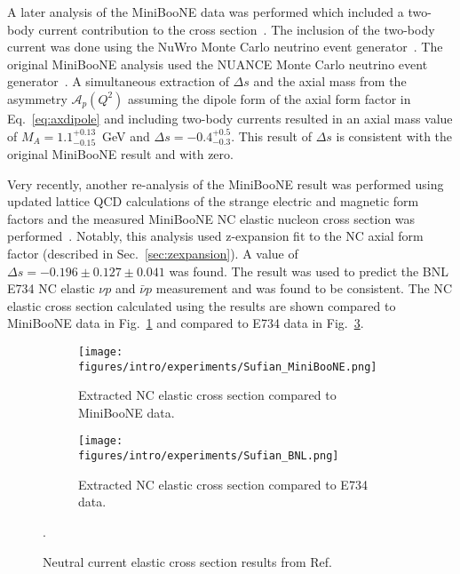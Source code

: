   A later analysis of the MiniBooNE data was performed which included a
  two-body current contribution to the cross section~\cite{Golan:2013jtj}.  The
  inclusion of the two-body current was done using the NuWro Monte Carlo
  neutrino event generator~\cite{Golan:2012wx}. The original MiniBooNE analysis
  used the NUANCE Monte Carlo neutrino event generator~\cite{Casper:2002sd}. A
  simultaneous extraction of $\Delta s$ and the axial mass from the asymmetry
  $\mathcal{A}_p(Q^2)$ assuming the dipole form of the axial form factor in
  Eq.~\ref{eq:axdipole} and including two-body currents resulted in an axial
  mass value of $M_A = 1.1^{+0.13}_{-0.15}$~GeV and $\Delta s =
  -0.4^{+0.5}_{-0.3}$. This result of $\Delta s$ is consistent with the
  original MiniBooNE result and with zero.

  Very recently, another re-analysis of the MiniBooNE result was performed
  using updated lattice QCD calculations of the strange electric and magnetic
  form factors and the measured MiniBooNE NC elastic nucleon cross section
  was performed~\cite{Sufian:2018qtw}. Notably, this analysis used
  z-expansion fit to the NC axial form factor (described in
  Sec.~\ref{sec:zexpansion}). A value of $\Delta s = -0.196\pm 0.127\pm
  0.041$ was found. The result was used to predict the BNL E734 NC elastic
  $\nu p$ and $\bar{\nu} p$ measurement and was found to be consistent. The
  NC elastic cross section calculated using the results are shown compared to
  MiniBooNE data in Fig.~\ref{fig:sufianuboone} and compared to E734 data in
  Fig.~\ref{fig:sufiane734}.
  \begin{figure}[h]
    \centering
    \begin{subfigure}[t]{2.5in}
      \texttt{[image: figures/intro/experiments/Sufian\_MiniBooNE.png]}
      \caption{Extracted NC elastic cross section compared to MiniBooNE data.}
      \label{fig:sufianuboone}
    \end{subfigure}
    \hspace{2pt}
    \begin{subfigure}[t]{2.5in}
      \texttt{[image: figures/intro/experiments/Sufian\_BNL.png]}
      \caption{Extracted NC elastic cross section compared to E734 data.}
      \label{fig:sufiane734}
    \end{subfigure}
    \caption{Neutral current elastic cross section results from
    Ref.~\cite{Sufian:2018qtw}}.
    \label{fig:sufiane734}
  \end{figure}


